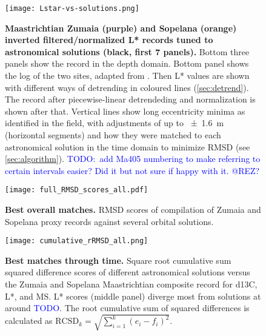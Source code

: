 \documentclass[draft]{agujournal2019}
\newcommand{\ijk}{\textcolor{blue}}
\begin{document}
\begin{figure}[htb]
  \centering
  \texttt{[image: Lstar-vs-solutions.png]}
  \caption{\label{fig:rolling-depth-age}
    \textbf{Maastrichtian Zumaia (purple) and Sopelana (orange) inverted filtered/normalized \gls{L*} records tuned to astronomical solutions (black, first 7 panels).}
    Bottom three panels show the record in the depth domain.
    Bottom panel shows the log of the two sites, adapted from .
    Then \gls{L*} values are shown with different ways of detrending in coloured lines (\cref{sec:detrend}).
    The record after piecewise-linear detrendeding and normalization is shown after that.
    Vertical lines show long eccentricity minima as identified in the field,
    with adjustments of up to \qty{\pm1.6}{\metre} (horizontal segments)
    and how they were matched to each astronomical solution in the time domain to minimize \gls{RMSD} (see \cref{sec:algorithm}).
    \ijk{TODO:\ add Ma405 numbering to make referring to certain intervals easier? Did it but not sure if happy with it. @REZ?}
    }
\end{figure}


\begin{figure}[htb]
    \centering
    \texttt{[image: full\_RMSD\_scores\_all.pdf]}
    \caption{\label{fig:full-RMSD-all} %
      \textbf{Best overall matches.}
        \gls{RMSD} scores of compilation of Zumaia and Sopelana proxy records against several orbital solutions.
    }
\end{figure}

\begin{figure}[htb]
  \centering
  \texttt{[image: cumulative\_rRMSD\_all.png]}
  \caption{\label{fig:cum-RMSD-all}
    \textbf{Best matches through time.}
    Square root cumulative sum squared difference scores of
    different astronomical solutions versus the Zumaia and Sopelana Maastrichtian composite record
    for \gls{d13C}, \gls{L*}, and \gls{MS}.
    \gls{L*} scores (middle panel) diverge most from solutions at around \ijk{TODO}.
    The root cumulative sum of squared differences is calculated as \(\text{RCSD}_{k} = \sqrt{\sum_{i=1}^{k}(e_{i} - f_{i})^{2}}\).
  }
\end{figure}
\end{document}
